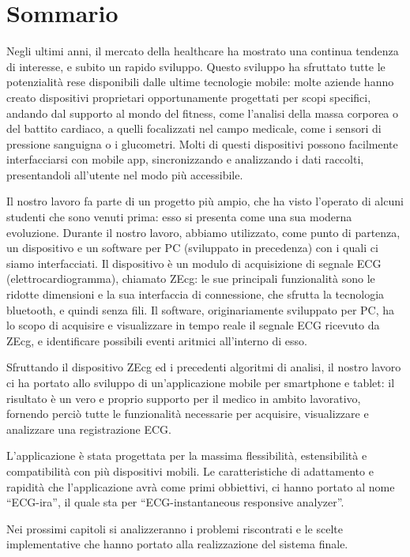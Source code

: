 \chapter{Sommario}

Negli ultimi anni, il mercato della healthcare ha mostrato una continua tendenza di interesse, e subito un rapido sviluppo. Questo sviluppo ha sfruttato tutte le potenzialità rese disponibili dalle ultime tecnologie mobile: molte aziende hanno creato dispositivi proprietari opportunamente progettati per scopi specifici, andando dal supporto al mondo del fitness, come l’analisi della massa corporea o del battito cardiaco, a quelli focalizzati nel campo medicale, come i sensori di pressione sanguigna o i glucometri. Molti di questi dispositivi possono facilmente interfacciarsi con mobile app, sincronizzando e analizzando i dati raccolti, presentandoli all'utente nel modo più accessibile.

Il nostro lavoro fa parte di un progetto più ampio, che ha visto l’operato di alcuni studenti che sono venuti prima: esso si presenta come una sua moderna evoluzione. Durante il nostro lavoro, abbiamo utilizzato, come punto di partenza, un dispositivo e un software per PC (sviluppato in precedenza) con i quali ci siamo interfacciati. Il dispositivo è un modulo di acquisizione di segnale ECG (elettrocardiogramma), chiamato ZEcg: le sue principali funzionalità sono le ridotte dimensioni e la sua interfaccia di connessione, che sfrutta la tecnologia bluetooth, e quindi senza fili. Il software, originariamente sviluppato per PC, ha lo scopo di acquisire e visualizzare in tempo reale il segnale ECG ricevuto da ZEcg, e identificare possibili eventi aritmici all’interno di esso.

Sfruttando il dispositivo ZEcg ed i precedenti algoritmi di analisi, il nostro lavoro ci ha portato allo sviluppo di un'applicazione mobile per smartphone e tablet: il risultato è un vero e proprio supporto per il medico in ambito lavorativo, fornendo perciò tutte le funzionalità necessarie per acquisire, visualizzare e analizzare una registrazione ECG. 

L'applicazione è stata progettata per la massima flessibilità, estensibilità e compatibilità con più dispositivi mobili. Le caratteristiche di adattamento e rapidità che l’applicazione avrà come primi obbiettivi, ci hanno portato al nome ``ECG-ira'', il quale sta per ``ECG-instantaneous responsive analyzer''. 

Nei prossimi capitoli si analizzeranno i problemi riscontrati e le scelte implementative che hanno portato alla realizzazione del sistema finale.